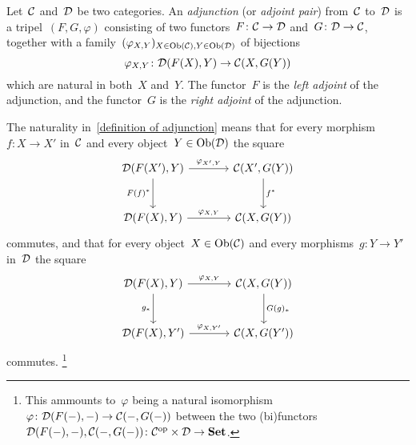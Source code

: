 \begin{definition}
  \label{definition of adjunction}
  Let~$\mathcal{C}$ and~$\mathcal{D}$ be two categories.
  An \emph{adjunction} (or \emph{adjoint pair}) from~$\mathcal{C}$ to~$\mathcal{D}$ is a tripel~$(F,G,\varphi)$ consisting of two functors~$F \colon \mathcal{C} \to \mathcal{D}$ and~$G \colon \mathcal{D} \to \mathcal{C}$, together with a family~$(\varphi_{X,Y})_{X \in \operatorname{Ob}(\mathcal{C}), Y \in \operatorname{Ob}(\mathcal{D})}$ of bijections
  \[
            \varphi_{X,Y}
    \colon  \mathcal{D}(F(X), Y)
    \to     \mathcal{C}(X, G(Y))
  \]
  which are natural in both~$X$ and~$Y$.
  The functor~$F$ is the \emph{left adjoint} of the adjunction, and the functor~$G$ is the \emph{right adjoint} of the adjunction.
\end{definition}


\begin{remark*}
  The naturality in~\cref{definition of adjunction} means that for every morphism~$f \colon X \to X'$ in~$\mathcal{C}$ and every object~$Y \in \operatorname{Ob}(\mathcal{D})$ the square
  \[
    \begin{tikzcd}[sep = large]
        \Dcat(F(X'), Y)
        \arrow{r}[above]{\varphi_{X',Y}}
        \arrow{d}[left]{F(f)^*}
      & \Ccat(X', G(Y))
        \arrow{d}[right]{f^*}
      \\
        \Dcat(F(X), Y)
        \arrow{r}[above]{\varphi_{X,Y}}
      & \Ccat(X, G(Y))
    \end{tikzcd}
  \]
  commutes, and that for every object~$X \in \operatorname{Ob}(\mathcal{C})$ and every morphisms~$g \colon Y \to Y'$ in~$\mathcal{D}$ the square
  \[
    \begin{tikzcd}[sep = large]
        \Dcat(F(X), Y)
        \arrow{r}[above]{\varphi_{X,Y}}
        \arrow{d}[left]{g_*}
      & \Ccat(X, G(Y))
        \arrow{d}[right]{G(g)_*}
      \\
        \Dcat(F(X), Y')
        \arrow{r}[above]{\varphi_{X,Y'}}
      & \Ccat(X, G(Y'))
    \end{tikzcd}
  \]
  commutes.%
  \footnote{This ammounts to~$\varphi$ being a natural isomorphism~$\varphi \colon \mathcal{D}(F(-), -) \to \mathcal{C}(-, G(-))$ between the two (bi)functors~$\mathcal{D}(F(-), -), \mathcal{C}(-, G(-)) \colon \mathcal{C}^{\mathrm{op}} \times \mathcal{D} \to \mathbf{Set}$.}
\end{remark*}


